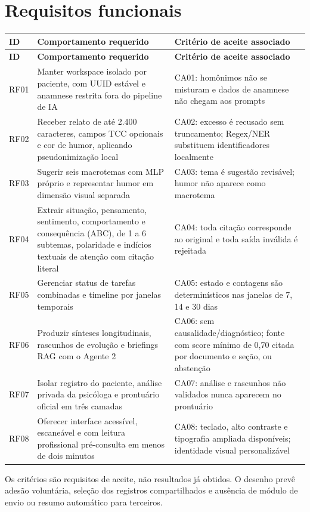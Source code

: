 \documentclass[11pt,a4paper]{article}
\begin{document}
\section{Requisitos funcionais}
\begingroup\small
\begin{longtable}{>{\raggedright\arraybackslash}p{}>{\raggedright\arraybackslash}p{}>{\raggedright\arraybackslash}p{}}
\toprule
\textbf{ID} & \textbf{Comportamento requerido} & \textbf{Critério de aceite associado} \\ \midrule\endfirsthead
\toprule
\textbf{ID} & \textbf{Comportamento requerido} & \textbf{Critério de aceite associado} \\ \midrule\endhead
\bottomrule\endfoot
RF01 & Manter workspace isolado por paciente, com UUID estável e anamnese restrita fora do pipeline de IA & CA01: homônimos não se misturam e dados de anamnese não chegam aos prompts \\[3pt]
RF02 & Receber relato de até 2.400 caracteres, campos TCC opcionais e cor de humor, aplicando pseudonimização local & CA02: excesso é recusado sem truncamento; Regex/NER substituem identificadores localmente \\[3pt]
RF03 & Sugerir seis macrotemas com MLP próprio e representar humor em dimensão visual separada & CA03: tema é sugestão revisável; humor não aparece como macrotema \\[3pt]
RF04 & Extrair situação, pensamento, sentimento, comportamento e consequência (ABC), de 1 a 6 subtemas, polaridade e indícios textuais de atenção com citação literal & CA04: toda citação corresponde ao original e toda saída inválida é rejeitada \\[3pt]
RF05 & Gerenciar status de tarefas combinadas e timeline por janelas temporais & CA05: estado e contagens são determinísticos nas janelas de 7, 14 e 30 dias \\[3pt]
RF06 & Produzir sínteses longitudinais, rascunhos de evolução e briefings RAG com o Agente 2 & CA06: sem causalidade/diagnóstico; fonte com score mínimo de 0,70 citada por documento e seção, ou abstenção \\[3pt]
RF07 & Isolar registro do paciente, análise privada da psicóloga e prontuário oficial em três camadas & CA07: análise e rascunhos não validados nunca aparecem no prontuário \\[3pt]
RF08 & Oferecer interface acessível, escaneável e com leitura profissional pré-consulta em menos de dois minutos & CA08: teclado, alto contraste e tipografia ampliada disponíveis; identidade visual personalizável \\[3pt]
\end{longtable}
\endgroup
Os critérios são requisitos de aceite, não resultados já obtidos. O desenho prevê adesão voluntária, seleção dos registros compartilhados e ausência de módulo de envio ou resumo automático para terceiros.
\end{document}
